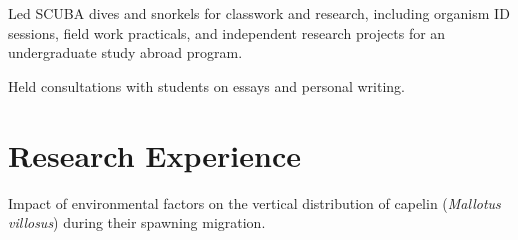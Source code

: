 \documentclass[a4paper]{deedy-resume} %
\begin{document}
Led SCUBA dives and snorkels for classwork and research, including organism ID sessions, field work practicals, and independent research projects for an undergraduate study abroad program.

\sectionspace %



Held consultations with students on essays and personal writing.

\sectionspace %
\sectionspace %


\section{Research Experience}


Impact of environmental factors on the vertical distribution of capelin (\textit{Mallotus villosus}) during their spawning migration.

\sectionspace %



\newpage %


\sectionspace

\end{document}
